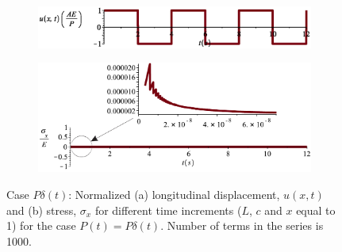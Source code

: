 \documentclass{article}
\begin{document}
\begin{figure}[H]
        \begin{subfigure}{1\textwidth}
            \includegraphics[width=0.9\columnwidth]{figures/d_u.eps} 
            \caption{}
        \end{subfigure}
        \begin{subfigure}{1\textwidth}
            \includegraphics[width=0.9\columnwidth]{figures/d_sigma.pdf} 
            \caption{}
        \end{subfigure}
    \caption{Case $P \delta(t)$: Normalized (a) longitudinal displacement, $u(x, t)$ and (b) stress, $\sigma_x$ for different time increments ($L$, $c$ and $x$ equal to 1) for the case $P(t) = P \delta(t)$. Number of terms in the series is 1000.}
    \label{fig:u_sigma_dirac}
\end{figure}


\newpage


\end{document}
